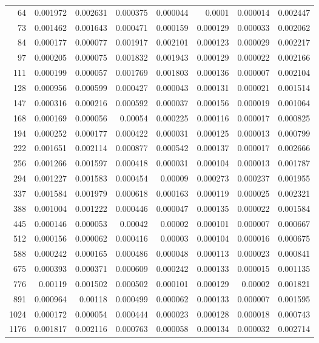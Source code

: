\begin{longtable}{r r r r r r r r}
64 & 0.001972 & 0.002631 & 0.000375 & 0.000044 & 0.0001 & 0.000014 & 0.002447 \\
73 & 0.001462 & 0.001643 & 0.000471 & 0.000159 & 0.000129 & 0.000033 & 0.002062 \\
84 & 0.000177 & 0.000077 & 0.001917 & 0.002101 & 0.000123 & 0.000029 & 0.002217 \\
97 & 0.000205 & 0.000075 & 0.001832 & 0.001943 & 0.000129 & 0.000022 & 0.002166 \\
111 & 0.000199 & 0.000057 & 0.001769 & 0.001803 & 0.000136 & 0.000007 & 0.002104 \\
128 & 0.000956 & 0.000599 & 0.000427 & 0.000043 & 0.000131 & 0.000021 & 0.001514 \\
147 & 0.000316 & 0.000216 & 0.000592 & 0.000037 & 0.000156 & 0.000019 & 0.001064 \\
168 & 0.000169 & 0.000056 & 0.00054 & 0.000225 & 0.000116 & 0.000017 & 0.000825 \\
194 & 0.000252 & 0.000177 & 0.000422 & 0.000031 & 0.000125 & 0.000013 & 0.000799 \\
222 & 0.001651 & 0.002114 & 0.000877 & 0.000542 & 0.000137 & 0.000017 & 0.002666 \\
256 & 0.001266 & 0.001597 & 0.000418 & 0.000031 & 0.000104 & 0.000013 & 0.001787 \\
294 & 0.001227 & 0.001583 & 0.000454 & 0.00009 & 0.000273 & 0.000237 & 0.001955 \\
337 & 0.001584 & 0.001979 & 0.000618 & 0.000163 & 0.000119 & 0.000025 & 0.002321 \\
388 & 0.001004 & 0.001222 & 0.000446 & 0.000047 & 0.000135 & 0.000022 & 0.001584 \\
445 & 0.000146 & 0.000053 & 0.00042 & 0.00002 & 0.000101 & 0.000007 & 0.000667 \\
512 & 0.000156 & 0.000062 & 0.000416 & 0.00003 & 0.000104 & 0.000016 & 0.000675 \\
588 & 0.000242 & 0.000165 & 0.000486 & 0.000048 & 0.000113 & 0.000023 & 0.000841 \\
675 & 0.000393 & 0.000371 & 0.000609 & 0.000242 & 0.000133 & 0.000015 & 0.001135 \\
776 & 0.00119 & 0.001502 & 0.000502 & 0.000101 & 0.000129 & 0.00002 & 0.001821 \\
891 & 0.000964 & 0.00118 & 0.000499 & 0.000062 & 0.000133 & 0.000007 & 0.001595 \\
1024 & 0.000172 & 0.000054 & 0.000444 & 0.000023 & 0.000128 & 0.000018 & 0.000743 \\
1176 & 0.001817 & 0.002116 & 0.000763 & 0.000058 & 0.000134 & 0.000032 & 0.002714 \\

\end{longtable}
